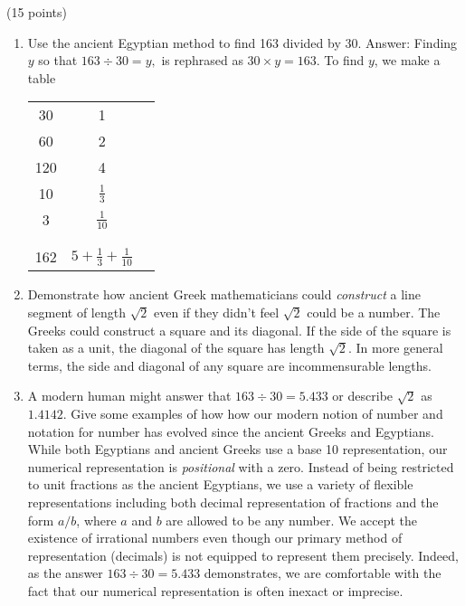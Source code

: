 \documentclass[11pt]{article}
\begin{document}
\item (15 points)
	\begin{enumerate}
	\item Use the ancient Egyptian method to find 163 divided by 30.
	\vfill
	Answer: Finding $y$ so that $163 \div 30 =y,$ is rephrased as $30 \times y=163.$ To find $y$, we make a table\\
	
	\begin{tabular}{ccl}
	30&1&\checkmark\\
	60&2\\
	120&4&\checkmark\\
	10&$\frac{1}{3}$&\checkmark\\
	3&$\frac{1}{10}$&\checkmark\\
	&&\\
	\hline
	&&\\
	162&$5+\frac{1}{3}+\frac{1}{10}$&
	\end{tabular}
	
	\item Demonstrate how ancient Greek mathematicians could \emph{construct} a line segment of length $\sqrt{2}$ even if they didn't feel $\sqrt{2}$ could be a number.
	\vfill
	The Greeks could construct a square and its diagonal. If the side of the square is taken as a unit, the diagonal of the square has length $\sqrt{2}.$ In more general terms, the side and diagonal of any square are incommensurable lengths.\\
	\vfill 
	\item A modern human might answer that $163 \div 30=5.433$ or describe $\sqrt{2}$ as $1.4142.$ Give some examples of how how our modern notion of number and notation for number has evolved since the ancient Greeks and Egyptians.\\
	\vfill
	While both Egyptians and ancient Greeks use a base 10 representation, our numerical representation is \emph{positional} with a zero. Instead of being restricted to unit fractions as the ancient Egyptians, we use a variety of flexible representations including both decimal representation of fractions and the form $a/b$, where $a$ and $b$ are allowed to be any number. We accept the existence of irrational numbers even though our primary method of representation (decimals) is not equipped to represent them precisely. Indeed, as the answer $163 \div 30=5.433$ demonstrates, we are comfortable with the fact that our numerical representation is often inexact or imprecise.  \\
	\vfill
	\end{enumerate}
\end{document}
